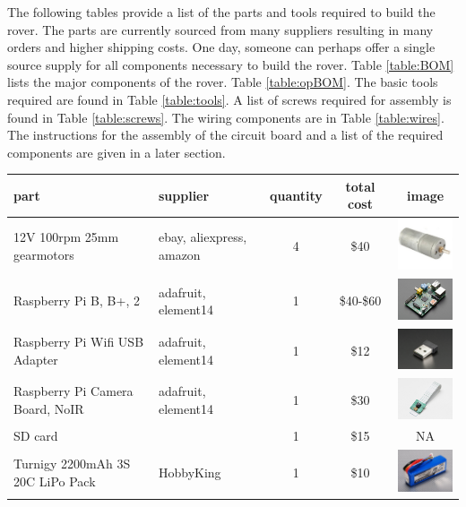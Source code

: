\documentclass[12pt,titlepage,oneside]{memoir}
\begin{document}
The following tables provide a list of the parts and tools required to build the rover. The parts are currently sourced from many suppliers resulting in many orders and higher shipping costs. 
One day, someone can perhaps offer a single source supply for all components necessary to build the rover. Table \ref{table:BOM} lists the major components of the rover. Table \ref{table:opBOM}. The basic tools required are found in Table \ref{table:tools}. A list of screws required for assembly is found in Table \ref{table:screws}. The wiring components are in Table \ref{table:wires}. The instructions for the assembly of the circuit board and a list of the required components are given in a later section.

\begin{table}[!h]
\begin{tabular}{p{4cm} | p{3.5cm} | c | c | c}
part & supplier &  quantity &   total cost & image\\
\hline
12V 100rpm 25mm gearmotors & ebay, aliexpress, amazon&  4  & \$40 & \includegraphics[width=80px]{picture/motor.png}\\
Raspberry Pi B, B+, 2 & adafruit, element14 & 1 & \$40-\$60 & \includegraphics[width=80px]{picture/pi.jpg}\\
Raspberry Pi Wifi USB Adapter & adafruit, element14 & 1 & \$12 & \includegraphics[width=80px]{picture/piwifi.jpg}\\
Raspberry Pi Camera Board, NoIR & adafruit, element14 & 1 & \$30 &  \includegraphics[width=80px]{picture/picam.jpg}\\
SD card & & 1 & \$15 & NA\\
Turnigy 2200mAh 3S 20C LiPo Pack & HobbyKing & 1 & \$10 &  \includegraphics[width=80px]{picture/lipo.jpg}\\

\end{tabular}
\end{table}
\end{document}
